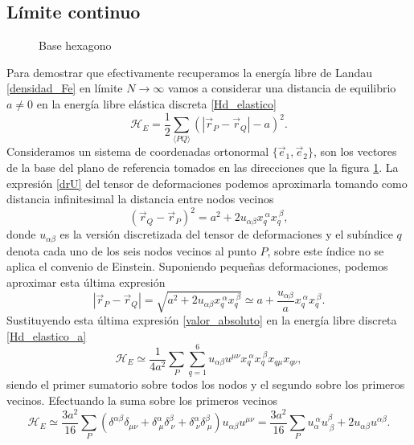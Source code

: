 \subsection{Límite continuo}
\begin{figure}[h]
\centering
 \resizebox{\columnwidth}{!}{}
\caption{Base hexagono}\label{base-hexagono-fig}
\end{figure}   
Para demostrar que efectivamente recuperamos la energía libre de Landau
\eqref{densidad_Fe} en límite $N\rightarrow \infty$ vamos a considerar una
distancia de equilibrio  $a\neq 0$ en la energía libre elástica discreta
\eqref{Hd_elastico}
\begin{equation}\label{Hd_elastico_a}
\mathcal{H}_E=\frac{1}{2}\sum_{\langle PQ
  \rangle}(|\vec{r}_P-\vec{r}_Q|-a)^2.
\end{equation}
Consideramos un sistema de coordenadas ortonormal $\{ \vec{e}_1,\vec{e}_2\}$,
son los vectores de la base del plano de referencia tomados en las direcciones
que la figura \ref{base-hexagono-fig}. La expresión \eqref{drU} del tensor de
deformaciones podemos aproximarla tomando como distancia infinitesimal la
distancia entre nodos vecinos \cite{Bowick:Membranes_review,Bowick_flat_phase}
\begin{equation*}
(\vec{r}_Q-\vec{r}_P)^2=a^2+2u_{\alpha\beta}x_q^{\ \alpha}x_q^{\ \beta},
\end{equation*}
donde $u_{\alpha\beta}$ es la versión discretizada del tensor de
deformaciones y el subíndice $q$ denota cada uno de los seis nodos vecinos al punto
$P$, sobre este índice no se aplica el convenio de Einstein. Suponiendo
pequeñas deformaciones, podemos aproximar esta última expresión
\begin{equation}\label{valor_absoluto}
|\vec{r}_P-\vec{r}_Q|=\sqrt{a^2+2u_{\alpha\beta}x_q^{\ \alpha}x_q^{\ \beta}}\simeq a + \frac{u_{\alpha\beta}}{a}x_q^{\ \alpha}x_q^{\ \beta}.
\end{equation}
Sustituyendo esta última expresión \eqref{valor_absoluto} en la energía libre discreta \eqref{Hd_elastico_a}
\begin{equation}\label{He}
\mathcal{H}_E\simeq \frac{1}{4a^2}\sum_{P} \sum^6_{q=1} u_{\alpha\beta}u^{\mu\nu}x_q^{\ \alpha}x_q^{\ \beta}x_{q\mu}x_{q\nu},
\end{equation}
siendo el primer sumatorio sobre todos los nodos y el segundo sobre los
primeros vecinos. Efectuando la suma sobre los primeros vecinos 
\begin{equation*}
\mathcal{H}_E\simeq\frac{3a^2}{16}\sum_{P}(\delta^{\alpha\beta}\delta_{\mu\nu}+\delta^{\alpha}_{\ \mu}\delta^{\beta}_{\ \nu}+
\delta^{\alpha}_{\ \nu}\delta^{\beta}_{\ \mu})
u_{\alpha\beta}u^{\mu\nu}=\frac{3a^2}{16}\sum_{P}u_{\alpha}^{\ \alpha}u^{\beta}_{\ \beta}+2u_{\alpha\beta}u^{\alpha\beta}.
\end{equation*}
